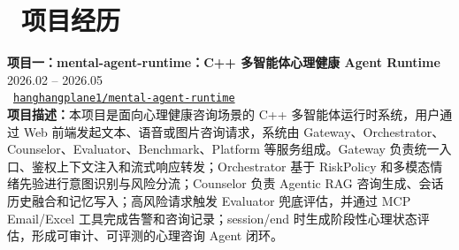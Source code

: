 \documentclass[10pt]{article}
\begin{document}
{\section{\makebox[\widthof{\faUsers}][c]{\color{CVBlue}\faUsers}\ 项目经历}

\textbf{项目一：mental-agent-runtime：C++ 多智能体心理健康 Agent Runtime} \hfill 2026.02 -- 2026.05\\[-0.10em]
{\footnotesize\faGithub\ \href{https://github.com/hanghangplane1/mental-agent-runtime}{\texttt{hanghangplane1/mental-agent-runtime}}}\\[-0.12em]
\textbf{项目描述：}本项目是面向心理健康咨询场景的 C++ 多智能体运行时系统，用户通过 Web 前端发起文本、语音或图片咨询请求，系统由 Gateway、Orchestrator、Counselor、Evaluator、Benchmark、Platform 等服务组成。Gateway 负责统一入口、鉴权上下文注入和流式响应转发；Orchestrator 基于 RiskPolicy 和多模态情绪先验进行意图识别与风险分流；Counselor 负责 Agentic RAG 咨询生成、会话历史融合和记忆写入；高风险请求触发 Evaluator 兜底评估，并通过 MCP Email/Excel 工具完成告警和咨询记录；session/end 时生成阶段性心理状态评估，形成可审计、可评测的心理咨询 Agent 闭环。

}
\end{document}
